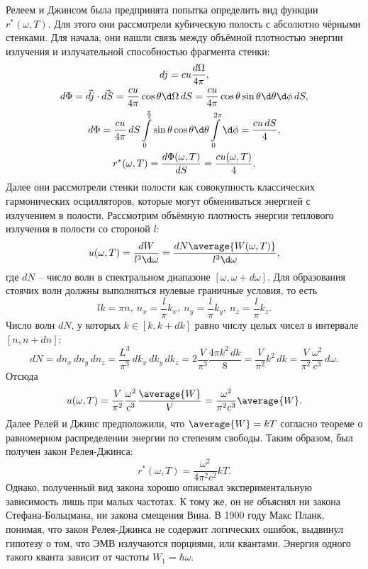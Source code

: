 Релеем и Джинсом была предпринята попытка определить вид функции
\( r^*(\omega, T) \). Для этого они рассмотрели кубическую полость с абсолютно
чёрными стенками. Для начала, они нашли связь между объёмной плотностью энергии
излучения и излучательной способностью фрагмента стенки:
\begin{gather*}
    dj = cu\frac{d\Omega}{4\pi},\\
    d\Phi = \vec{dj}\cdot\vec{dS} = \frac{cu}{4\pi}\cos\theta\d\Omega\,dS =
    \frac{cu}{4\pi}\cos\theta\sin\theta\d\theta\d\phi\,dS,\\
    d\Phi = \frac{cu}{4\pi}\,dS\int\limits_0^\frac{\pi}{2}\sin\theta\cos\theta
    \d\theta\int\limits_0^{2\pi}\d\phi = \frac{cu\,dS}{4},\\
    r^*(\omega, T) = \frac{d\Phi(\omega, T)}{dS} = \frac{cu(\omega, T)}{4}.
\end{gather*}
Далее они рассмотрели стенки полости как совокупность классических гармонических
осцилляторов, которые могут обмениваться энергией с излучением в полости.
Рассмотрим объёмную плотность энергии теплового излучения в полости со стороной
\( l \):
\[
    u(\omega, T) = \frac{dW}{l^3\d\omega} =
    \frac{dN\average{W(\omega, T)}}{l^3\d\omega},
\]
где \( dN \) -- число волн в спектральном диапазоне
\( [\omega, \omega+d\omega] \). Для образования стоячих волн должны выполняться
нулевые граничные условия, то есть
\[
    lk = \pi n,\ n_x = \frac{l}{\pi}k_x,\ n_y = \frac{l}{\pi}k_y,\ 
    n_z = \frac{l}{\pi}k_z.
\]
Число волн \( dN \), у которых \( k\in[k, k+dk] \) равно числу целых чисел в 
интервале \( [n, n+dn] \):
\[
    dN = dn_x\,dn_y\,dn_z = \frac{L^3}{\pi^3}\,dk_x\,dk_y\,dk_z =
    2\frac{V}{\pi^3}\frac{4\pi k^2\,dk}{8} = \frac{V}{\pi^2}k^2\,dk =
    \frac{V}{\pi^2}\frac{\omega^2}{c^3}\,d\omega.
\]
Отсюда
\[
    u(\omega, T) =
    \frac{V}{\pi^2}\frac{\omega^2}{c^3}\frac{\average{W}}{V} =
    \frac{\omega^2}{\pi^2c^3}\average{W}.
\]
Далее Релей и Джинс предположили, что \( \average{W} = kT \) согласно
теореме о равномерном распределении энергии по степеням свободы. Таким образом,
был получен закон Релея-Джинса:
\[
    r^*(\omega, T) = \frac{\omega^2}{4\pi^2c^2}kT.
\]
Однако, полученный вид закона хорошо описывал экспериментальную зависимость лишь
при малых частотах. К тому же, он не объяснял ни закона Стефана-Больцмана, ни
закона смещения Вина.
В 1900 году Макс Планк, понимая, что закон Релея-Джинса не содержит логических
ошибок, выдвинул гипотезу о том, что ЭМВ излучаются порциями, или квантами.
Энергия одного такого кванта зависит от частоты \( W_1 = \hbar\omega \).
